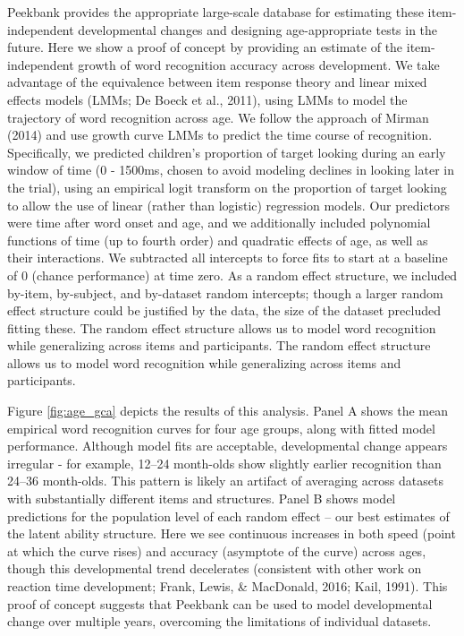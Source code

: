 \documentclass[10pt, letterpaper]{article}
\begin{document}
Peekbank provides the appropriate large-scale database for estimating
these item-independent developmental changes and designing
age-appropriate tests in the future. Here we show a proof of concept by
providing an estimate of the item-independent growth of word recognition
accuracy across development. We take advantage of the equivalence
between item response theory and linear mixed effects models (LMMs; De
Boeck et al., 2011), using LMMs to model the trajectory of word
recognition across age. We follow the approach of Mirman (2014) and use
growth curve LMMs to predict the time course of recognition.
Specifically, we predicted children's proportion of target looking
during an early window of time (0 - 1500ms, chosen to avoid modeling
declines in looking later in the trial), using an empirical logit
transform on the proportion of target looking to allow the use of linear
(rather than logistic) regression models. Our predictors were time after
word onset and age, and we additionally included polynomial functions of
time (up to fourth order) and quadratic effects of age, as well as their
interactions. We subtracted all intercepts to force fits to start at a
baseline of 0 (chance performance) at time zero. As a random effect
structure, we included by-item, by-subject, and by-dataset random
intercepts; though a larger random effect structure could be justified
by the data, the size of the dataset precluded fitting these. The random
effect structure allows us to model word recognition while generalizing
across items and participants. The random effect structure allows us to
model word recognition while generalizing across items and participants.

Figure \ref{fig:age_gca} depicts the results of this analysis. Panel A
shows the mean empirical word recognition curves for four age groups,
along with fitted model performance. Although model fits are acceptable,
developmental change appears irregular - for example, 12--24 month-olds
show slightly earlier recognition than 24--36 month-olds. This pattern
is likely an artifact of averaging across datasets with substantially
different items and structures. Panel B shows model predictions for the
population level of each random effect -- our best estimates of the
latent ability structure. Here we see continuous increases in both speed
(point at which the curve rises) and accuracy (asymptote of the curve)
across ages, though this developmental trend decelerates (consistent
with other work on reaction time development; Frank, Lewis, \&
MacDonald, 2016; Kail, 1991). This proof of concept suggests that
Peekbank can be used to model developmental change over multiple years,
overcoming the limitations of individual datasets.
\end{document}
